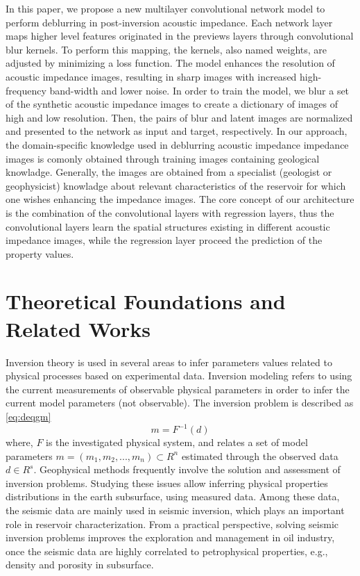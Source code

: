 \documentclass[conference]{IEEEtran}
\begin{document}
In this paper, we propose a new multilayer convolutional network model to perform deblurring in post-inversion acoustic impedance.
Each network layer maps higher level features originated in the previews layers through convolutional blur kernels.
To perform this mapping, the kernels, also named weights, are adjusted by minimizing a loss function. 
The model enhances the resolution of acoustic impedance images, resulting in sharp images with
increased high-frequency band-width and lower noise.
In order to train the model, we blur a set of the synthetic acoustic impedance images to create a dictionary of
images of high and low resolution. Then, the pairs of blur and latent images are normalized and 
presented to the network as input and target, respectively.
In our approach, the domain-specific knowledge used in deblurring acoustic impedance impedance images is comonly
obtained through training images containing geological knowladge. Generally, the images are obtained from a specialist
(geologist or geophysicist) knowladge about relevant characteristics of the reservoir for which one wishes enhancing the impedance images.
The core concept of our architecture is the combination of the convolutional layers with regression layers, thus the convolutional layers learn the spatial structures existing in different acoustic impedance images, while the regression layer proceed the prediction of the property values.

\section{Theoretical Foundations and Related Works}
Inversion theory is used in several areas to infer parameters values
related to physical processes based on experimental data.
Inversion modeling refers to using the current measurements of observable
physical parameters in order to infer the current model parameters (not observable).
The inversion problem is described as  \eqref{eq:deqgm}
\begin{equation}
\label{eq:deqgm}
m = F^{-1}(d)
\end{equation}
where, $F$ is the investigated physical system, and relates a set of model parameters
$m=(m_1, m_2,...,m_n)\subset R^n$ estimated through the observed data $d \in R^s$.
Geophysical methods frequently involve the solution and assessment of inversion problems.
Studying these issues allow inferring physical properties distributions in the earth subsurface, using measured
data. Among these data, the seismic data are mainly used in seismic inversion, which plays an important role in
reservoir characterization. From a practical perspective, solving seismic inversion problems improves
the exploration and management in oil industry, once the seismic data are highly correlated to petrophysical
properties, e.g., density and porosity in subsurface.
\end{document}
